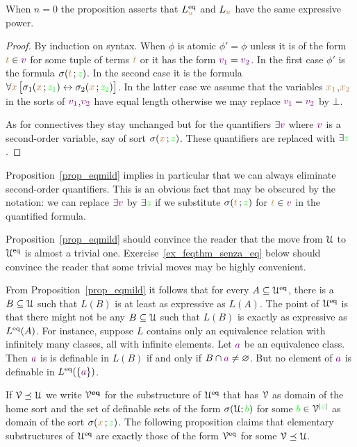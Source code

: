 \documentclass[creche.tex]{subfiles}
\begin{document}
When $n=0$ the proposition asserts that $L_{{\color{brown} u}}^{{\rm eq}}$ and $L_{{\color{brown} u}}$ have the same expressive power.

\begin{proof}
By induction on syntax. When $\phi$ is atomic $\phi'=\phi$ unless it is of the form ${\color{brown} t}\in {\color{violet}v}$ for some tuple of terms ${\color{brown} t}$ or it has the form ${\color{violet} v_1}={\color{violet} v_2}$. In the first case $\phi'$ is the formula $\sigma({\color{brown} t}\,;{\color{green} z})$. In the second case it is the formula $\forall {\color{brown}x}\,\big[\sigma_1({\color{brown} x}\,;{\color{green} z_1}) \leftrightarrow\sigma_2({\color{brown} x}\,;{\color{green} z_2})\big]$. In the latter case we assume that the variables ${\color{brown} x_1}$,${\color{brown} x_2}$ in the sorts of  ${\color{violet} v_1}$,${\color{violet} v_2}$ have equal length otherwise we may replace ${\color{violet} v_1}={\color{violet} v_2}$ by $\bot$.

As for connectives they stay unchanged but for the quantifiers $\exists {\color{violet}v}$ where ${\color{violet} v}$ is a second-order variable, say of sort $\sigma({\color{brown} x}\,;{\color{green} z})$. These quantifiers are replaced with $\exists{\color{green}z}$.
\end{proof}

Proposition~\ref{prop_eqmild} implies in particular that we can always eliminate second-order quantifiers. This is an obvious fact that may be obscured by the notation: we can replace $\exists {\color{violet}v}$ by $\exists {\color{green}z}$ if we substitute  $\sigma({\color{brown} t}\,;{\color{green} z})$ for ${\color{brown} t}\in {\color{violet}v}$ in the quantified formula.

Proposition~\ref{prop_eqmild} should convince the reader that the move from $\EuScript U$ to $\EuScript U^{{\rm eq}}$ is almost a trivial one. Exercise~\ref{ex_feqthm_senza_eq} below should convince the reader that some trivial moves may be highly convenient.


\begin{remark}\label{rem_eqmild}
From Proposition~\ref{prop_eqmild} it follows that for every $A\subseteq\EuScript U^{{\rm eq}}$, there is a $B\subseteq\EuScript U$ such that $L(B)$ is at least as expressive as $L(A)$. The point of $\EuScript U^{{\rm eq}}$ is that there might not be any $B\subseteq\EuScript U$ such that $L(B)$ is exactly as expressive as $L^{{\rm eq}}(A)$. For instance, suppose $L$ contains only an equivalence relation with infinitely many classes, all with infinite elements. Let ${\color{violet} a}$ be an equivalence class. Then ${\color{violet} a}$ is is definable in $L(B)$ if and only if $B\cap {\color{violet}a}\neq\varnothing$. But no element of ${\color{violet} a}$ is definable in $L^{{\rm eq}}(\{{\color{violet} a}\})$.\QED
\end{remark}

If $\EuScript V\preceq\EuScript U$ we write \emph{$\EuScript V^{\textbf{eq}}$\/} for the substructure of $\EuScript U^{{\rm eq}}$ that has $\EuScript V$ as domain of the home sort and  the set of definable sets of the form $\sigma(\EuScript U;{\color{green} b})$ for some ${\color{green} b}\in \EuScript V^{|{\color{green} z}|}$ as domain of the sort $\sigma({\color{brown} x}\,;{\color{green} z})$. 
The following proposition claims that elementary substructures of $\EuScript U^{{\rm eq}}$ are exactly those of the form $\EuScript V^{{\rm eq}}$ for some $\EuScript V\preceq\EuScript U$. 
\end{document}
